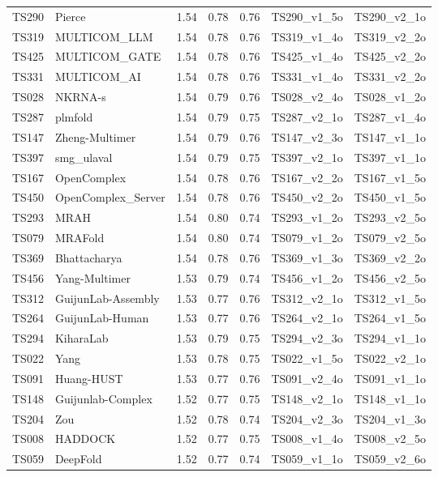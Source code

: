 \begin{longtable}{lllllll}
TS290 & Pierce & 1.54 & 0.78 & 0.76 & TS290\_v1\_5o & TS290\_v2\_1o \\ 
TS319 & MULTICOM\_LLM & 1.54 & 0.78 & 0.76 & TS319\_v1\_4o & TS319\_v2\_2o \\ 
TS425 & MULTICOM\_GATE & 1.54 & 0.78 & 0.76 & TS425\_v1\_4o & TS425\_v2\_2o \\ 
TS331 & MULTICOM\_AI & 1.54 & 0.78 & 0.76 & TS331\_v1\_4o & TS331\_v2\_2o \\ 
TS028 & NKRNA-s & 1.54 & 0.79 & 0.76 & TS028\_v2\_4o & TS028\_v1\_2o \\ 
TS287 & plmfold & 1.54 & 0.79 & 0.75 & TS287\_v2\_1o & TS287\_v1\_4o \\ 
TS147 & Zheng-Multimer & 1.54 & 0.79 & 0.76 & TS147\_v2\_3o & TS147\_v1\_1o \\ 
TS397 & smg\_ulaval & 1.54 & 0.79 & 0.75 & TS397\_v2\_1o & TS397\_v1\_1o \\ 
TS167 & OpenComplex & 1.54 & 0.78 & 0.76 & TS167\_v2\_2o & TS167\_v1\_5o \\ 
TS450 & OpenComplex\_Server & 1.54 & 0.78 & 0.76 & TS450\_v2\_2o & TS450\_v1\_5o \\ 
TS293 & MRAH & 1.54 & 0.80 & 0.74 & TS293\_v1\_2o & TS293\_v2\_5o \\ 
TS079 & MRAFold & 1.54 & 0.80 & 0.74 & TS079\_v1\_2o & TS079\_v2\_5o \\ 
TS369 & Bhattacharya & 1.54 & 0.78 & 0.76 & TS369\_v1\_3o & TS369\_v2\_2o \\ 
TS456 & Yang-Multimer & 1.53 & 0.79 & 0.74 & TS456\_v1\_2o & TS456\_v2\_5o \\ 
TS312 & GuijunLab-Assembly & 1.53 & 0.77 & 0.76 & TS312\_v2\_1o & TS312\_v1\_5o \\ 
TS264 & GuijunLab-Human & 1.53 & 0.77 & 0.76 & TS264\_v2\_1o & TS264\_v1\_5o \\ 
TS294 & KiharaLab & 1.53 & 0.79 & 0.75 & TS294\_v2\_3o & TS294\_v1\_1o \\ 
TS022 & Yang & 1.53 & 0.78 & 0.75 & TS022\_v1\_5o & TS022\_v2\_1o \\ 
TS091 & Huang-HUST & 1.53 & 0.77 & 0.76 & TS091\_v2\_4o & TS091\_v1\_1o \\ 
TS148 & Guijunlab-Complex & 1.52 & 0.77 & 0.75 & TS148\_v2\_1o & TS148\_v1\_1o \\ 
TS204 & Zou & 1.52 & 0.78 & 0.74 & TS204\_v2\_3o & TS204\_v1\_3o \\ 
TS008 & HADDOCK & 1.52 & 0.77 & 0.75 & TS008\_v1\_4o & TS008\_v2\_5o \\ 
TS059 & DeepFold & 1.52 & 0.77 & 0.74 & TS059\_v1\_1o & TS059\_v2\_6o \\ 

\end{longtable}
